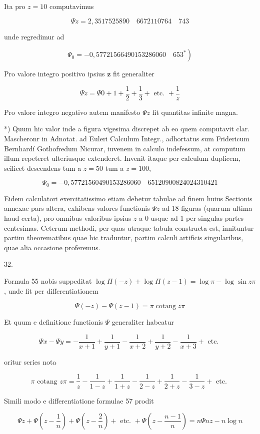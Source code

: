 \documentclass[10pt]{article}
\begin{document}
Ita pro \(z=10\) computavimus

\[
\Psi z=2,3517525890 \quad 6672110764 \quad 743
\]

unde regredimur ad

\[
\left.\Psi_{0}=-0,57721566490153286060 \quad 653^{*}\right)
\]

Pro valore integro positivo ipsius \(\boldsymbol{z}\) fit generaliter

\[
\Psi z=\Psi 0+1+\frac{1}{2}+\frac{1}{3}+\text { etc. }+\frac{1}{z}
\]

Pro valore integro negativo autem manifesto \(\Psi z\) fit quantitas infinite magna.

*) Quum hic valor inde a figura vigesima discrepet ab eo quem computavit clar. Mascheronr in Adnotat. ad Euleri Calculum Integr., adhortatus sum Fridericum Bernhardí Gothofredum Nicurar, iuvenem in calculo indefessum, at computum illum repeteret ulteriusque extenderet. Invenit itaque per calculum duplicem, scilicet descendens tum a \(z=50\) tum a \(z=100\),

\[
\Psi_{0}=-0,57721560490153286060 \quad 65120900824024310421
\]

Eidem calculatori exercitatissimo etiam debetur tabulae ad finem huius Sectionis annexae pars altera, exhibens valores functionis \(\Psi z\) ad 18 figuras (quarum ultima haud certa), pro omnibus valoribus ipsius \(z\) a 0 usque ad 1 per singulas partes centesimas. Ceterum methodi, per quas utraque tabula constructa est, innituntur partim theorematibus quae hic traduntur, partim calculi artificis singularibus, quae alia occasione proferemus.

32.

Formula 55 nobis suppeditat \(\log \Pi(-z)+\log \Pi(z-1)=\log \pi-\log \sin z \pi\), unde fit per differentiationem

\[
\Psi(-z)-\Psi(z-1)=\pi \operatorname{cotang} z \pi
\]

Et quum e definitione functionis \(\Psi\) generaliter habeatur

\[
\Psi x-\Psi y=-\frac{1}{x+1}+\frac{1}{y+1}-\frac{1}{x+2}+\frac{1}{y+2}-\frac{1}{x+3}+\text { etc. }
\]

oritur series nota

\[
\pi \text { cotang } z \pi=\frac{1}{z}-\frac{1}{1-z}+\frac{1}{1+z}-\frac{1}{2-z}+\frac{1}{2+z}-\frac{1}{3-z}+\text { etc. }
\]

Simili modo e differentiatione formulae 57 prodit

\[
\Psi z+\Psi\left(z-\frac{1}{n}\right)+\Psi\left(z-\frac{2}{n}\right)+\text { etc. }+\Psi\left(z-\frac{n-1}{n}\right)=n \Psi n z-n \log n
\]
\end{document}
